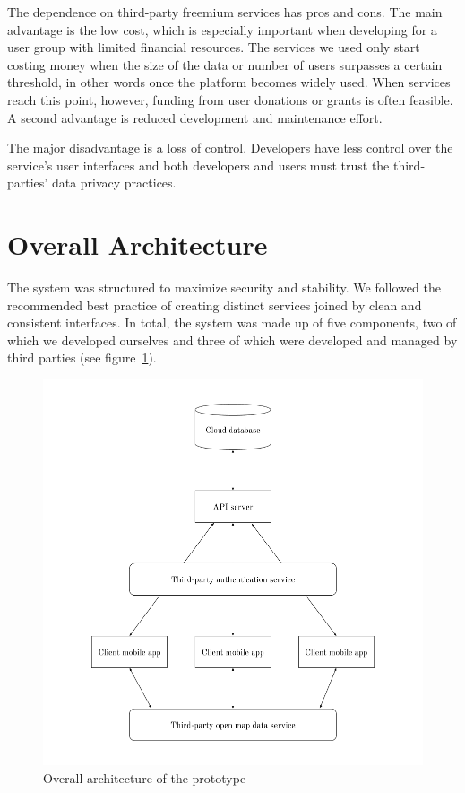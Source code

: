 The dependence on third-party freemium services has pros and cons. The main advantage is the low cost, which is especially important when developing for a user group with limited financial resources. The services we used only start costing money when the size of the data or number of users surpasses a certain threshold, in other words once the platform becomes widely used. When services reach this point, however, funding from user donations or grants is often feasible. A second advantage is reduced development and maintenance effort.

The major disadvantage is a loss of control. Developers have less control over the service's user interfaces and both developers and users must trust the third-parties' data privacy practices.


\section{Overall Architecture}
\label{sec:overall_architecture}

The system was structured to maximize security and stability. We followed the recommended best practice of creating distinct services joined by clean and consistent interfaces. In total, the system was made up of five components, two of which we developed ourselves and three of which were developed and managed by third parties (see figure~\ref{fig:overall_architecture}).

\begin{figure}[ht]
  \centering
  \includegraphics[scale=0.5]{images/overall_architecture.png}
  \caption{Overall architecture of the prototype}
  \label{fig:overall_architecture}
\end{figure}

